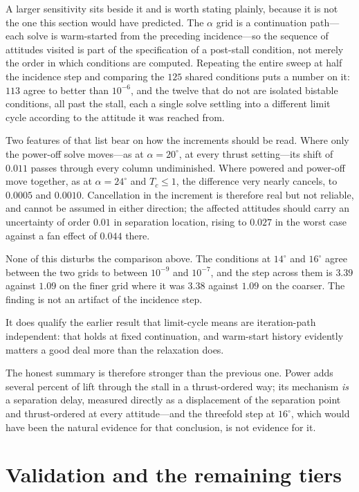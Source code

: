 \documentclass[submit]{aiaa-tc}
\begin{document}
A larger sensitivity sits beside it and is worth stating plainly, because
it is not the one this section would have predicted. The $\alpha$ grid is
a continuation path---each solve is warm-started from the preceding
incidence---so the sequence of attitudes visited is part of the
specification of a post-stall condition, not merely the order in which
conditions are computed. Repeating the entire sweep at half the incidence
step and comparing the $125$ shared conditions puts a number on it: $113$
agree to better than $10^{-6}$, and the twelve that do not are isolated
bistable conditions, all past the stall, each a single solve settling into
a different limit cycle according to the attitude it was reached from.

Two features of that list bear on how the increments should be read. Where
only the power-off solve moves---as at $\alpha = 20^\circ$, at every
thrust setting---its shift of $0.011$ passes through every column
undiminished. Where powered and power-off move together, as at
$\alpha = 24^\circ$ and $T_c \leq 1$, the difference very nearly cancels,
to $0.0005$ and $0.0010$. Cancellation in the increment is therefore real
but not reliable, and cannot be assumed in either direction; the affected
attitudes should carry an uncertainty of order $0.01$ in separation
location, rising to $0.027$ in the worst case against a fan effect of
$0.044$ there.

None of this disturbs the comparison above. The conditions at $14^\circ$
and $16^\circ$ agree between the two grids to between $10^{-9}$ and
$10^{-7}$, and the step across them is $3.39$ against $1.09$ on the finer
grid where it was $3.38$ against $1.09$ on the coarser. The finding is not
an artifact of the incidence step.

It does qualify the earlier result that limit-cycle means are
iteration-path independent: that holds at fixed continuation, and
warm-start history evidently matters a good deal more than the relaxation does.

The honest summary is therefore stronger than the previous one. Power
adds several percent of lift through the stall in a thrust-ordered way;
its mechanism \emph{is} a separation delay, measured directly as a
displacement of the separation point and thrust-ordered at every
attitude---and the threefold step at $16^\circ$, which would have been
the natural evidence for that conclusion, is not evidence for it.

\section{Validation and the remaining tiers}
\label{sec:outlook}
\end{document}
